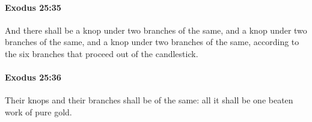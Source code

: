 		\paragraph{Exodus 25:35} %
			\label{EXODUS-25-35}

			And there shall be a knop under two branches of the same, and a knop under two branches of the same, and a knop under two branches of the same, according to the six branches that proceed out of the candlestick.


		\paragraph{Exodus 25:36} %
			\label{EXODUS-25-36}

			Their knops and their branches shall be of the same: all it shall be one beaten work of pure gold.



